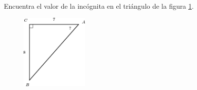 Encuentra el valor de la incógnita en el triángulo de la figura \ref{fig:angle_functrig_26}.
\begin{figure}[H]
    \begin{center}
        \includegraphics[width=0.3\textwidth]{../images/angle_functrig_26.png}
    \end{center}
    \caption{}
    \label{fig:angle_functrig_26}
\end{figure}